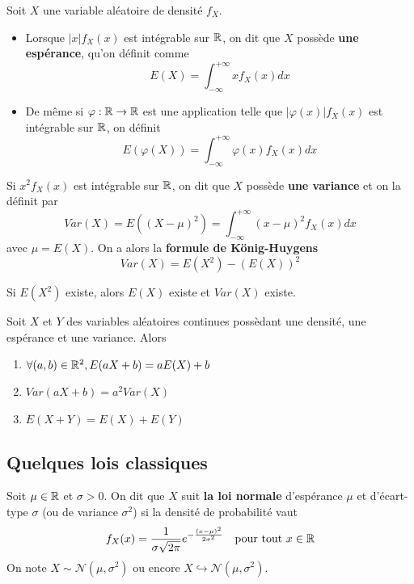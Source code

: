 \documentclass[a4paper,12pt]{article}
\begin{document}
\begin{definition}
    Soit $X$ une variable aléatoire de densité $f_X$.
    \begin{itemize}
        \item Lorsque $|x| f_X(x)$ est intégrable sur $\mathbb{R}$, on dit
        que $X$ possède \textbf{une espérance}, qu'on définit comme
        $$
        E(X) = \int_{-\infty}^{+\infty} x f_X(x) dx
        $$
        \item De même si $\varphi: \mathbb{R} \to \mathbb{R}$ est une application telle que
        $|\varphi(x)| f_X(x)$ est intégrable sur $\mathbb{R}$, on définit
        $$
        E(\varphi(X)) = \int_{-\infty}^{+\infty} \varphi(x) f_X(x) dx
        $$
    \end{itemize}
\end{definition}

\begin{definition}
    Si $x^2 f_X(x)$ est intégrable sur $\mathbb{R}$, on dit que $X$ possède \textbf{une variance} et on la définit par
    $$
    Var(X) = E((X - \mu)^2) = \int_{-\infty}^{+\infty} (x - \mu)^2 f_X(x) dx
    $$
    avec $\mu = E(X)$.
    On a alors la \textbf{formule de König-Huygens}
    $$
    Var(X) = E(X^2) - (E(X))^2
    $$
\end{definition}

\begin{remarque}
    Si $E(X^2)$ existe, alors $E(X)$ existe et $Var(X)$ existe.
\end{remarque}

\begin{theoreme}{}{}
    Soit $X$ et $Y$ des variables aléatoires continues possèdant une densité, une espérance et une variance. Alors
    \begin{enumerate}
        \item $\forall (a, b) \in \mathbb{R}^2, E(aX + b) = aE(X) + b$
        \item $Var(aX + b) = a^2 Var(X)$
        \item $E(X + Y) = E(X) + E(Y)$
    \end{enumerate}
\end{theoreme}

\clearpage

\subsection{Quelques lois classiques}

\begin{definition}
    Soit $\mu \in \mathbb{R}$ et $\sigma > 0$. On dit que $X$ suit \textbf{la loi normale} d'espérance $\mu$ et d'écart-type $\sigma$ (ou de variance $\sigma^2$)
    si la densité de probabilité vaut
    $$
    f_X(x) = \dfrac{1}{\sigma \sqrt{2\pi}} e^{-\frac{(x-\mu)^2}{2\sigma^2}} \quad \text{pour tout } x \in \mathbb{R}
    $$
    On note $X \sim \mathcal{N}(\mu, \sigma^2)$ ou encore $X \hookrightarrow \mathcal{N}(\mu, \sigma^2)$.
\end{definition}
\end{document}

